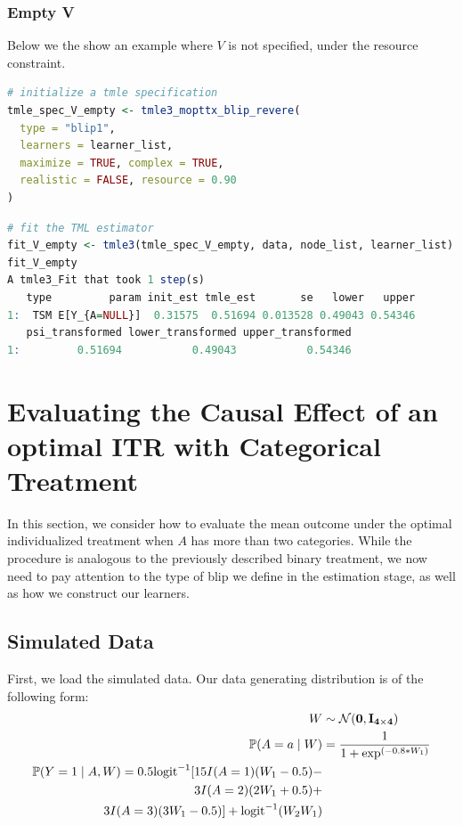 \documentclass[
  12pt, krantz2,
]{krantz}
\renewcommand{\P}{\mathbb{P}}
\newcommand{\1}{\mathbbm{1}}
\theoremstyle{definition}
\theoremstyle{definition}
\theoremstyle{definition}
\theoremstyle{definition}
\theoremstyle{remark}
\begin{document}
\hypertarget{empty-v}{%
\subsubsection{Empty V}\label{empty-v}}

Below we the show an example where \(V\) is not specified, under the
resource constraint.

\begin{lstlisting}[language=R]
# initialize a tmle specification
tmle_spec_V_empty <- tmle3_mopttx_blip_revere(
  type = "blip1",
  learners = learner_list,
  maximize = TRUE, complex = TRUE,
  realistic = FALSE, resource = 0.90
)
\end{lstlisting}

\begin{lstlisting}[language=R]
# fit the TML estimator
fit_V_empty <- tmle3(tmle_spec_V_empty, data, node_list, learner_list)
fit_V_empty
A tmle3_Fit that took 1 step(s)
   type         param init_est tmle_est       se   lower   upper
1:  TSM E[Y_{A=NULL}]  0.31575  0.51694 0.013528 0.49043 0.54346
   psi_transformed lower_transformed upper_transformed
1:         0.51694           0.49043           0.54346
\end{lstlisting}

\hypertarget{oit-eval-cat}{%
\section{Evaluating the Causal Effect of an optimal ITR with Categorical Treatment}\label{oit-eval-cat}}

In this section, we consider how to evaluate the mean outcome under the optimal
individualized treatment when \(A\) has more than two categories. While the
procedure is analogous to the previously described binary treatment, we now need
to pay attention to the type of blip we define in the estimation stage, as well
as how we construct our learners.

\hypertarget{simulated-data-1}{%
\subsection{Simulated Data}\label{simulated-data-1}}

First, we load the simulated data. Our data generating distribution is
of the following form:
\begin{align*}
  W &\sim \mathcal{N}(\bf{0},I_{4 \times 4})\\
  \P(A=a \mid W) &= \frac{1}{1+\exp^{(-0.8*W_1)}}\\
  \P(Y=1 \mid A,W) = 0.5\text{logit}^{-1}[15I(A=1)(W_1-0.5) - \\
    3I(A=2)(2W_1+0.5) + \\
    3I(A=3)(3W_1-0.5)] +\text{logit}^{-1}(W_2W_1) \\
\end{align*}
\end{document}

